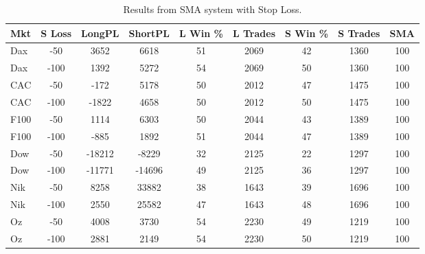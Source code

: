 \begin{table}[ht]
\centering
\caption[SMA Base System with Stop Loss]{Results from SMA system with Stop Loss.} 
\label{tab:sma_results_Sloss}
\begin{tabular}{lcccccccc}
  \toprule Mkt & S Loss & LongPL & ShortPL & L Win \% & L Trades & S Win \% & S Trades & SMA \\ 
  \midrule Dax & -50 & 3652 & 6618 & 51 & 2069 & 42 & 1360 & 100 \\ 
  Dax & -100 & 1392 & 5272 & 54 & 2069 & 50 & 1360 & 100 \\ 
  CAC & -50 & -172 & 5178 & 50 & 2012 & 47 & 1475 & 100 \\ 
  CAC & -100 & -1822 & 4658 & 50 & 2012 & 50 & 1475 & 100 \\ 
  F100 & -50 & 1114 & 6303 & 50 & 2044 & 43 & 1389 & 100 \\ 
  F100 & -100 & -885 & 1892 & 51 & 2044 & 47 & 1389 & 100 \\ 
  Dow & -50 & -18212 & -8229 & 32 & 2125 & 22 & 1297 & 100 \\ 
  Dow & -100 & -11771 & -14696 & 49 & 2125 & 36 & 1297 & 100 \\ 
  Nik & -50 & 8258 & 33882 & 38 & 1643 & 39 & 1696 & 100 \\ 
  Nik & -100 & 2550 & 25582 & 47 & 1643 & 48 & 1696 & 100 \\ 
  Oz & -50 & 4008 & 3730 & 54 & 2230 & 49 & 1219 & 100 \\ 
  Oz & -100 & 2881 & 2149 & 54 & 2230 & 50 & 1219 & 100 \\ 
   \bottomrule \end{tabular}
\end{table}

